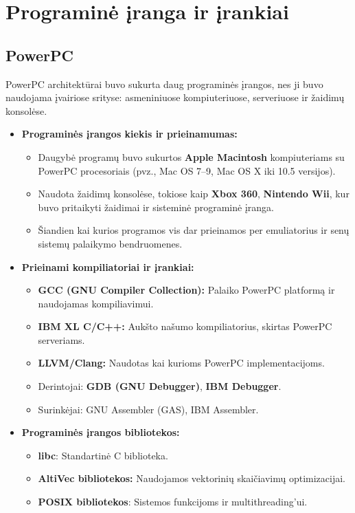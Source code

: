\documentclass{article}
\begin{document}
\section{Programinė įranga ir įrankiai}
\subsection{PowerPC}
PowerPC architektūrai buvo sukurta daug programinės įrangos, nes ji buvo naudojama įvairiose srityse: asmeniniuose kompiuteriuose, serveriuose ir žaidimų konsolėse.

\begin{itemize}
    \item \textbf{Programinės įrangos kiekis ir prieinamumas:}
        \begin{itemize}
            \item Daugybė programų buvo sukurtos \textbf{Apple Macintosh} kompiuteriams su PowerPC procesoriais (pvz., Mac OS 7–9, Mac OS X iki 10.5 versijos).
            \item Naudota žaidimų konsolėse, tokiose kaip \textbf{Xbox 360}, \textbf{Nintendo Wii}, kur buvo pritaikyti žaidimai ir sisteminė programinė įranga.
            \item Šiandien kai kurios programos vis dar prieinamos per emuliatorius ir senų sistemų palaikymo bendruomenes.
        \end{itemize}
    \item \textbf{Prieinami kompiliatoriai ir įrankiai:}
        \begin{itemize}
            \item \textbf{GCC (GNU Compiler Collection):} Palaiko PowerPC platformą ir naudojamas kompiliavimui.
            \item \textbf{IBM XL C/C++:} Aukšto našumo kompiliatorius, skirtas PowerPC serveriams.
            \item \textbf{LLVM/Clang:} Naudotas kai kurioms PowerPC implementacijoms.
            \item Derintojai: \textbf{GDB (GNU Debugger)}, \textbf{IBM Debugger}.
            \item Surinkėjai: GNU Assembler (GAS), IBM Assembler.
        \end{itemize}
    \item \textbf{Programinės įrangos bibliotekos:}
        \begin{itemize}
            \item \textbf{libc}: Standartinė C biblioteka.
            \item \textbf{AltiVec bibliotekos:} Naudojamos vektorinių skaičiavimų optimizacijai.
            \item \textbf{POSIX bibliotekos}: Sistemos funkcijoms ir multithreading'ui.
        \end{itemize}
\end{itemize}
\end{document}

